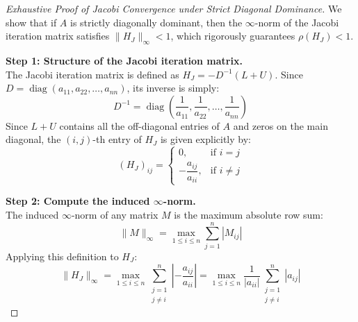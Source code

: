 \begin{proof}[Exhaustive Proof of Jacobi Convergence under Strict Diagonal Dominance]
We show that if $A$ is strictly diagonally dominant, then the $\infty$-norm of the Jacobi iteration matrix satisfies $\|H_J\|_\infty < 1$, which rigorously guarantees $\rho(H_J) < 1$.

\medskip
\noindent\textbf{Step 1: Structure of the Jacobi iteration matrix.} \\
The Jacobi iteration matrix is defined as $H_J = -D^{-1}(L + U)$. Since $D = \operatorname{diag}(a_{11}, a_{22}, \dots, a_{nn})$, its inverse is simply:
\begin{equation}
    D^{-1} = \operatorname{diag}\left( \frac{1}{a_{11}}, \frac{1}{a_{22}}, \dots, \frac{1}{a_{nn}} \right)
\end{equation}
Since $L + U$ contains all the off-diagonal entries of $A$ and zeros on the main diagonal, the $(i, j)$-th entry of $H_J$ is given explicitly by:
\begin{equation}
    (H_J)_{ij} = \begin{cases}
    0, & \text{if } i = j \\
    -\dfrac{a_{ij}}{a_{ii}}, & \text{if } i \ne j
    \end{cases}
\end{equation}

\noindent\textbf{Step 2: Compute the induced $\infty$-norm.} \\
The induced $\infty$-norm of any matrix $M$ is the maximum absolute row sum:
\begin{equation}
    \|M\|_\infty = \max_{1 \le i \le n} \sum_{j=1}^n |M_{ij}|
\end{equation}
Applying this definition to $H_J$:
\begin{equation}
    \|H_J\|_\infty = \max_{1 \le i \le n} \sum_{\substack{j=1 \\ j \ne i}}^n \left| -\frac{a_{ij}}{a_{ii}} \right| = \max_{1 \le i \le n} \frac{1}{|a_{ii}|} \sum_{\substack{j=1 \\ j \ne i}}^n |a_{ij}|
\end{equation}


\end{proof}
